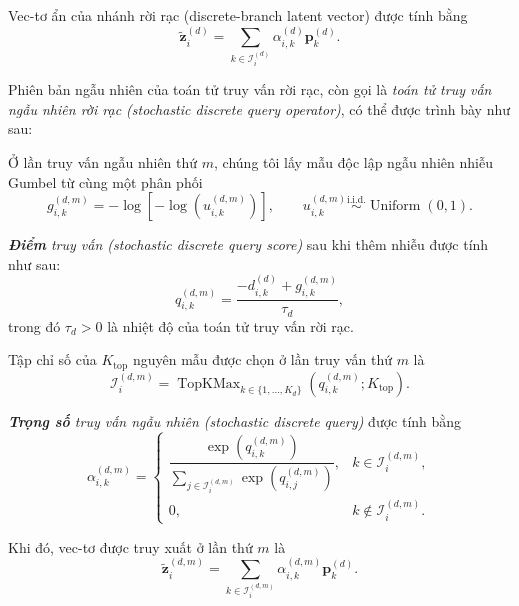 Vec-tơ ẩn của nhánh rời rạc (discrete-branch latent vector) được tính bằng
\begin{equation}
\widetilde{\mathbf{z}}^{(d)}_{i}
=
\sum_{k\in\mathcal{I}^{(d)}_{i}}
\alpha^{(d)}_{i,k}\mathbf{p}^{(d)}_k.
\end{equation}

Phiên bản ngẫu nhiên của toán tử truy vấn rời rạc, còn gọi là \textit{toán tử truy vấn ngẫu nhiên rời rạc (stochastic discrete query operator)}, có thể được trình bày như sau:

Ở lần truy vấn ngẫu nhiên thứ \(m\), chúng tôi lấy mẫu độc lập ngẫu nhiên nhiễu Gumbel từ cùng một phân phối
\begin{equation}
g^{(d,m)}_{i,k}
=
-\log\left[-\log\left(u^{(d,m)}_{i,k}\right)\right],
\qquad
u^{(d,m)}_{i,k}
\overset{\mathrm{i.i.d.}}{\sim}
\operatorname{Uniform}(0,1).
\end{equation}

\textit{\textbf{Điểm} truy vấn (stochastic discrete query score)} sau khi thêm nhiễu được tính như sau:
\begin{equation}
q^{(d,m)}_{i,k}
=
\frac{
-d^{(d)}_{i,k}
+
g^{(d,m)}_{i,k}
}{\tau_d},
\end{equation}
trong đó \(\tau_d>0\) là nhiệt độ của toán tử truy vấn rời rạc.

Tập chỉ số của \(K_{\mathrm{top}}\) nguyên mẫu được chọn ở lần truy vấn thứ \(m\) là
\begin{equation}
\mathcal{I}^{(d,m)}_{i}
=
\operatorname{TopKMax}_{k\in\{1,\ldots,K_d\}}
\left(
q^{(d,m)}_{i,k};
K_{\mathrm{top}}
\right).
\end{equation}

\textit{\textbf{Trọng số} truy vấn ngẫu nhiên (stochastic discrete query)} được tính bằng
\begin{equation}
\alpha^{(d,m)}_{i,k}
=
\begin{cases}
\dfrac{
\exp\left(q^{(d,m)}_{i,k}\right)
}{
\displaystyle
\sum_{j\in\mathcal{I}^{(d,m)}_{i}}
\exp\left(q^{(d,m)}_{i,j}\right)
},
&
k\in\mathcal{I}^{(d,m)}_{i},
\\[12pt]
0,
&
k\notin\mathcal{I}^{(d,m)}_{i}.
\end{cases}
\end{equation}

Khi đó, vec-tơ được truy xuất ở lần thứ \(m\) là
\begin{equation}
\widetilde{\mathbf{z}}^{(d,m)}_{i}
=
\sum_{k\in\mathcal{I}^{(d,m)}_{i}}
\alpha^{(d,m)}_{i,k}
\mathbf{p}^{(d)}_k.
\end{equation}

